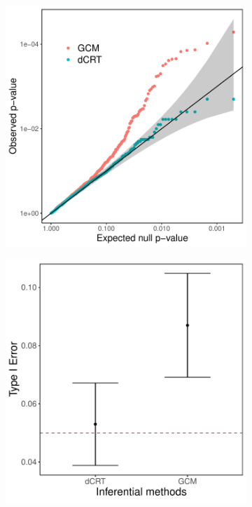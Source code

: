\documentclass[aos]{imsart}
\theoremstyle{definition}
\theoremstyle{remark}
\begin{document}
	\begin{figure}
		\begin{subfigure}[b]{0.49\textwidth}
			\centering
			\includegraphics[width=\linewidth]{Figures/qq-plots.pdf} \\
		\end{subfigure}%
		\begin{subfigure}[b]{0.49\textwidth}
			\centering
			\includegraphics[width=\linewidth]{Figures/type_I_err_5e-2.pdf} \\ 
		\end{subfigure}
	

\end{figure}
\end{document}
